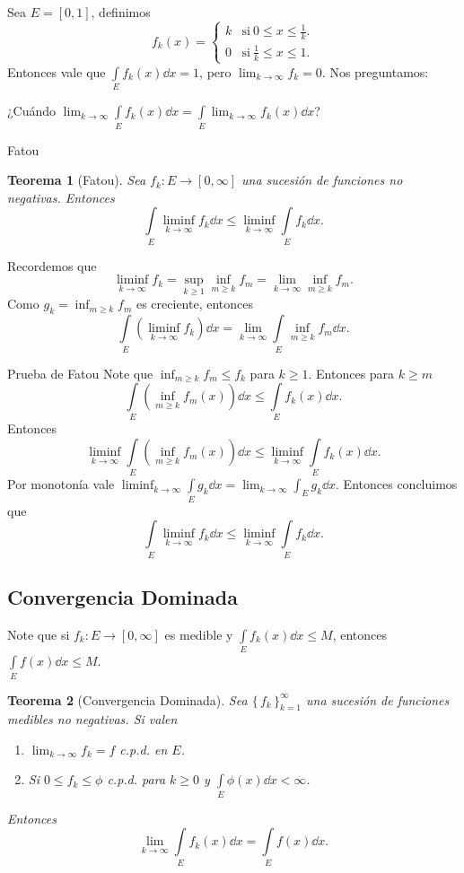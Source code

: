 \documentclass[utf8]{beamer}
\theoremstyle{plain}
\newtheorem{Th}{Teorema}               %
\theoremstyle{definition}
\theoremstyle{remark}
\numberwithin{equation}{section}
\newcommand{\bonj}[1]{\left\lbrack#1\right\rbrack}
\newcommand{\set}[1]{\{\,#1\,\}}    %
\renewcommand{\geq}{\geqslant}          %
\renewcommand{\leq}{\leqslant}          %
\newcommand{\suck}{_{k=1}^\infty} %
\renewcommand{\.}{\Cdot}                %
\begin{document}
\begin{frame}
  Sea $E=\bonj{0,1}$, definimos 
  $$
  f_k(x)=\begin{cases}
    k &\text{si}\ 0\leq x\leq \frac1k.\\
    0 &\text{si}\ \frac{1}{k}\leq x\leq 1.
  \end{cases}
  $$
  Entonces vale que $\int\limits_Ef_k(x)\dd x=1$, pero $\lim_{k\to\infty}f_k=0$. Nos preguntamos:\par 
  \begin{center}
    ¿Cuándo $\displaystyle\lim_{k\to\infty}\int\limits_Ef_k(x)\dd x=\int\limits_E\lim_{k\to\infty}f_k(x)\dd x$?
  \end{center}
\end{frame}

\begin{frame}{Fatou}
  \begin{Th}[Fatou]\label{th:Fatou}
Sea $f_k:E\to\bonj{0,\infty}$ una sucesión de funciones no negativas. Entonces 
$$\int\limits_E\liminf_{k\to\infty}f_k\dd x\leq \liminf_{k\to\infty}\int\limits_Ef_k\dd x.$$
  \end{Th}
  Recordemos que 
  $$  \liminf_{k\to\infty}f_k=\sup_{k\geq 1}\inf_{m\geq k}f_m=\lim_{k\to\infty}\inf_{m\geq k}f_m.$$
  Como $g_k=\inf_{m\geq k}f_m$ es creciente, entonces
  $$\int\limits_E(\liminf_{k\to\infty}f_k)\dd x=\lim_{k\to\infty}\int\limits_E\inf_{m\geq k}f_m\dd x.$$
\end{frame}

\begin{frame}{Prueba de Fatou}
  Note que $\inf_{m\geq k}f_m\leq f_k$ para $k\geq 1$. Entonces para $k\geq m$
  $$\int\limits_E(\inf_{m\geq k}f_m(x))\dd x\leq \int\limits_Ef_k(x)\dd x.$$
  Entonces 
  $$\liminf_{k\to\infty}\int\limits_E(\inf_{m\geq k}f_m(x))\dd x\leq \liminf_{k\to\infty}\int\limits_Ef_k(x)\dd x.$$
  Por monotonía vale $\liminf_{k\to\infty}\int\limits_Eg_k\dd x=\lim_{k\to\infty}\int_Eg_k\dd x$. Entonces concluimos que
  $$\int\limits_E\liminf_{k\to\infty}f_k\dd x\leq \liminf_{k\to\infty}\int\limits_Ef_k\dd x.$$
\end{frame}

\subsection{Convergencia Dominada}

\begin{frame}
  Note que si $f_k:E\to\bonj{0,\infty}$ es medible y $\int\limits_Ef_k(x)\dd x\leq M$, entonces $\int\limits_Ef(x)\dd x\leq M$.
  \begin{Th}[Convergencia Dominada]\label{th:LebesgueDCT}
    Sea $\set{f_k}\suck$ una sucesión de funciones medibles no negativas. Si valen 
    \begin{enumerate}
      \item $\lim_{k\to\infty}f_k=f$ c.p.d. en $E$.
      \item Si $0\leq f_k\leq\phi$ c.p.d. para $k\geq 0$ y $\int\limits_E\phi(x)\dd x<\infty$.
    \end{enumerate}
    Entonces
    $$\lim_{k\to\infty}\int\limits_Ef_k(x)\dd x=\int\limits_Ef(x)\dd x.$$
  \end{Th}
\end{frame}
\end{document}

